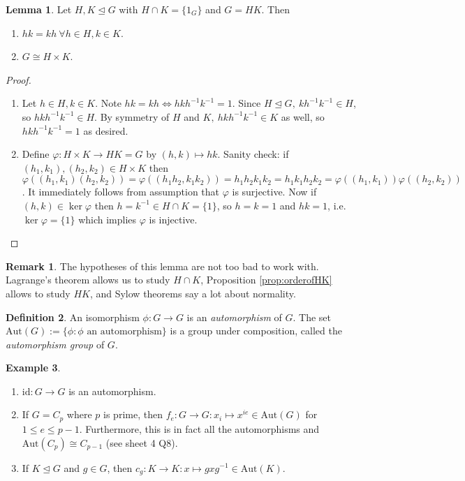 \documentclass[a4paper]{article}
\newcommand{\Aut}{\text{Aut}}
\newcommand{\id}{\text{id}}
\theoremstyle{definition}
\newtheorem{defn}{Definition}[subsection]
\newtheorem{lemma}[defn]{Lemma}
\newtheorem{example}[defn]{Example}
\newtheorem*{remark}{Remark}
\begin{document}
\begin{lemma}
\label{lemma:GisHKthenGcongHKifHKnormalanditsc1}
Let $H,K\unlhd G$ with $H\cap K=\{1_G\}$ and $G=HK$. Then
\begin{enumerate}
\item $hk=kh \ \forall h\in H,k\in K$.
\item $G\cong H\times K$.
\end{enumerate}
\end{lemma}
\begin{proof}
\begin{enumerate}
\item Let $h\in H,k\in K$. Note $hk=kh \Leftrightarrow hkh^{-1}k^{-1}=1$. Since $H\unlhd G,\ kh^{-1}k^{-1}\in H$, so $hkh^{-1}k^{-1}\in H$. By symmetry of $H$ and $K,\ hkh^{-1}k^{-1}\in K$ as well, so $hkh^{-1}k^{-1}=1$ as desired.
\item Define $\varphi:H\times K\rightarrow HK=G$ by $(h,k)\mapsto hk$. Sanity check: if $(h_1,k_1),(h_2,k_2)\in H\times K$ then $\varphi((h_1,k_1)(h_2,k_2))=\varphi((h_1h_2,k_1k_2))=h_1h_2k_1k_2=h_1k_1h_2k_2=\varphi((h_1,k_1))\varphi((h_2,k_2))$. It immediately follows from assumption that $\varphi$ is surjective. Now if $(h,k)\in\ker\varphi$ then $h=k^{-1}\in H\cap K=\{1\}$, so $h=k=1$ and $hk=1$, i.e. $\ker\varphi=\{1\}$ which implies $\varphi$ is injective. 
\end{enumerate}
\end{proof}

\begin{remark}
The hypotheses of this lemma are not too bad to work with. Lagrange's theorem allows us to study $H\cap K$, Proposition \ref{prop:orderofHK} allows to study $HK$, and Sylow theorems say a lot about normality.
\end{remark}

\begin{defn}
An isomorphism $\phi:G\rightarrow G$ is an \textit{automorphism} of $G$. The set $\Aut(G):=\{\phi:\phi\text{ an automorphism}\}$ is a group under composition, called the \textit{automorphism group} of $G$.
\end{defn}
\begin{example}
\label{example:auto}
\begin{enumerate}
\item $\id:G\rightarrow G$ is an automorphism.
\item If $G=C_p$ where $p$ is prime, then $f_e:G\rightarrow G:x_i\mapsto x^{ie}\in \Aut(G)$ for $1\leq e\leq p-1$. Furthermore, this is in fact all the automorphisms and $\Aut(C_p)\cong C_{p-1}$ (see sheet 4 Q8).
\item If $K\unlhd G$ and $g\in G$, then $c_g:K\rightarrow K:x\mapsto gxg^{-1}\in\Aut(K)$.
\end{enumerate}
\end{example}
\end{document}

